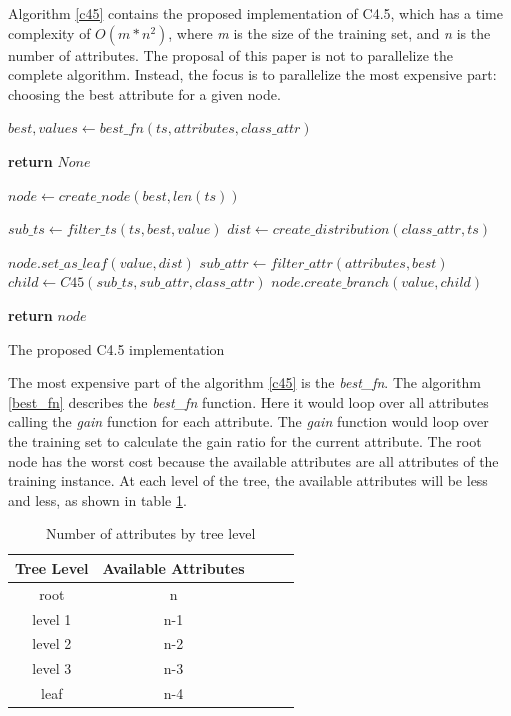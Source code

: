 \documentclass[conference]{IEEEtran}
\begin{document}
Algorithm \ref{c45} contains the proposed implementation of C4.5, which has a time complexity of $O(m * n^2)$, where \textit{m} is the size of the training set, and \textit{n} is the number of attributes. The proposal of this paper is not to parallelize the complete algorithm. Instead, the focus is to parallelize the most expensive part: choosing the best attribute for a given node. 

\begin{algorithm}
\begin{algorithmic}[1]
    \State $best,values \gets best\_fn(ts, attributes, class\_attr)$
    
        \State \textbf{return} $None$
    \EndIf
    
    \State $node \gets create\_node(best, len(ts))$
    
        \State $sub\_ts \gets filter\_ts(ts, best, value)$
        \State $dist \gets create\_distribution(class\_attr, ts)$
        
            \State $node.set\_as\_leaf(value, dist)$
        \Else
            \State $sub\_attr \gets filter\_attr(attributes, best)$
            \State $child \gets C45(sub\_ts, sub\_attr, class\_attr)$
                \State $node.create\_branch(value, child)$
            \EndIf
        \EndIf
        
    \EndFor
   \State \textbf{return} $node$
\EndProcedure
\end{algorithmic}
\caption{The proposed C4.5 implementation}
\label{c45}
\end{algorithm}

The most expensive part of the algorithm \ref{c45} is the \textit{best\_fn}. The algorithm \ref{best_fn} describes the \textit{best\_fn} function. Here it would loop over all attributes calling the \textit{gain} function for each attribute. The \textit{gain} function would loop over the training set to calculate the gain ratio for the current attribute. The root node has the worst cost because the available attributes are all attributes of the training instance. At each level of the tree, the available attributes will be less and less, as shown in table \ref{table:attributes_len}.

\begin{table}[!ht]
\centering
\begin{tabular}{ |c|c|c|c|c| }
\hline
Tree Level &Available Attributes \\
\hline
root &n \\
level 1 &n-1 \\
level 2 &n-2 \\
level 3 &n-3 \\
leaf &n-4 \\
\hline
\end{tabular}
\caption{Number of attributes by tree level}
\label{table:attributes_len}
\end{table}
\end{document}
